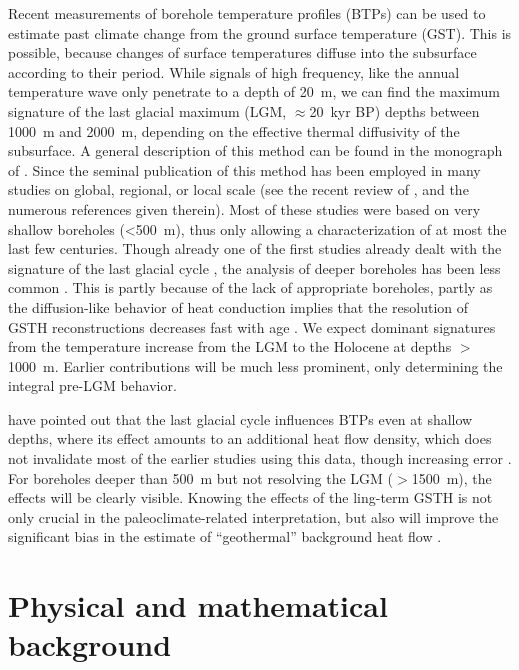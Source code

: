 \documentclass[cp]{copernicus}
\begin{document}
\introduction 
\label{sec:intro}
Recent measurements of borehole temperature profiles (BTPs) can be used to estimate past climate 
change from the ground surface temperature (GST). This is possible, because changes of surface 
temperatures diffuse into the sub­surface according to their period. While signals of high 
frequency, like the annual temperature wave only pene­trate to a depth of 20~m, we can find 
the maximum signature of the last glacial maximum (LGM, $\approx$20~kyr BP) depths between 1000~m 
and 2000~m, depending on the effective thermal diffusivity of the subsurface. A general description
of this method can be found in the monograph of \citet{Bodri2007a}. Since the seminal publi­cation 
of \citet{Lachenbruch1986a} this method has been employed in many studies on global, regional, or 
local scale (see the recent review of \citet{Gonzalez-Rouco2009a}, and the numerous references 
given therein). Most of these studies were based on very shallow boreholes (<500~m), thus only 
allowing a characterization of at most the last few centuries. Though already one of the first 
studies already dealt with the signature of the last glacial cycle \citep{Hotchkiss1934a}, the 
analysis of deeper boreholes has been less common \citep{Demezhko2014a, Kukkonen2011a, 
Kukkonen2011b, Chouinard2009a,  Majorowicz2008a, Rath2007a, Mottaghy2006a, Demezhko2001a, 
Clauser1995a}. This is partly because of the lack of appropriate boreholes, partly as the 
diffusion-like behavior of heat conduction implies that the resolution of GSTH reconstructions 
decreases fast with age \cite[e.g.][]{Demezhko2001a}. We expect dominant signatures from the 
temperature increase from the LGM to the Holocene at depths $>$1000~m. Earlier contributions will be 
much less prominent, only determining the integral pre-LGM behavior. 

\citet{Rath2012a} have pointed out that the last glacial cycle influences BTPs even at shallow 
depths, where its effect amounts to an additional heat flow density, which does not invalidate most 
of the earlier studies using this data, though increasing error \citep{Beltrami2011a, Rath2012a}. 
For boreholes deeper than 500~m but not resolving the LGM ($>$1500~m), the effects will be clearly 
visible. Knowing the effects of the ling-term GSTH is not only crucial in the paleoclimate-related 
interpretation, but also will improve the significant bias in the estimate of ``geothermal'' 
background heat­ flow \cite[e.g.][]{Westaway2013a,Majorowicz2011a,Slagstad2009a}. 


\section{Physical and mathematical background}
\end{document}
